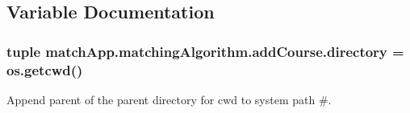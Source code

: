 \subsection{Variable Documentation}
\subsubsection[{directory}]{\setlength{\rightskip}{0pt plus 5cm}tuple match\+App.\+matching\+Algorithm.\+add\+Course.\+directory = os.\+getcwd()}\label{namespacematch_app_1_1matching_algorithm_1_1add_course_a6e7c3f074c5f1319de59da69820f345d}


Append parent of the parent directory for cwd to system path \#. 

